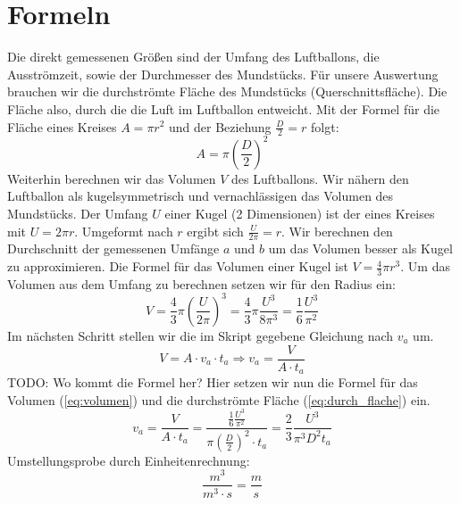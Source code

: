 \documentclass{article}
\begin{document}
    \section{Formeln}
    Die direkt gemessenen Größen sind der Umfang des Luftballons, die Ausströmzeit, sowie der Durchmesser des Mundstücks.
    Für unsere Auswertung brauchen wir die durchströmte Fläche des Mundstücks (Querschnittsfläche).
    Die Fläche also, durch die die Luft im Luftballon entweicht.
    Mit der Formel für die Fläche eines Kreises \( A = \pi {r}^2 \) und der Beziehung \( \frac{D}{2} = r\) folgt:
    \begin{equation} \label{eq:durch_flache}
        A = \pi {\left( \frac{D}{2} \right)}^2
    \end{equation}
    Weiterhin berechnen wir das Volumen \(V\) des Luftballons.
    Wir nähern den Luftballon als kugelsymmetrisch und vernachlässigen das Volumen des Mundstücks.
    Der Umfang \(U\) einer Kugel (2 Dimensionen) ist der eines Kreises mit \(U = 2 \pi r\). Umgeformt nach \(r\) ergibt sich \(\frac{U}{2 \pi} = r\).
    Wir berechnen den Durchschnitt der gemessenen Umfänge \(a\) und \(b\) um das Volumen besser als Kugel zu approximieren.
    Die Formel für das Volumen einer Kugel ist \( V = \frac{4}{3} \pi r^3 \).
    Um das Volumen aus dem Umfang zu berechnen setzen wir für den Radius ein:
    \begin{equation} \label{eq:volumen}
        V = \frac{4}{3} \pi {\left( \frac{U}{2 \pi} \right) }^3 = \frac{4}{3} \pi \frac{U^3}{8 \pi^3} = \frac{1}{6} \frac{U^3}{\pi^2}
    \end{equation}
    Im nächsten Schritt stellen wir die im Skript gegebene Gleichung nach \(v_a\) um.
    \[ V = A \cdot v_a \cdot t_a \Rightarrow v_a = \frac{V}{A \cdot t_a}\] TODO: Wo kommt die Formel her?
    Hier setzen wir nun die Formel für das Volumen (\ref{eq:volumen}) und die durchströmte Fläche (\ref{eq:durch_flache}) ein.
    \begin{equation} \label{eq:calc_velocity}
        v_a = \frac{V}{A \cdot t_a} = \frac{\frac{1}{6} \frac{U^3}{\pi^2} }{ \pi {\left(\frac{D}{2}\right)}^2 \cdot t_a} = \frac{2}{3} \frac{U^3}{\pi^3 D^2 t_a}
    \end{equation}
    Umstellungsprobe durch Einheitenrechnung:
    \begin{equation*}
        \frac{m^3}{m^3 \cdot s} = \frac{m}{s}
    \end{equation*}  
\end{document}
